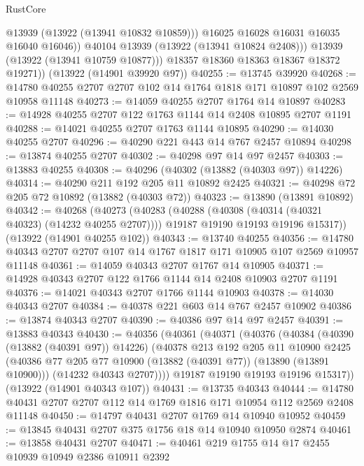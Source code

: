 \begin{lexlean}{RustCore}
\begin{coremodule}
                  @13939
                  (@13922 (@13941 @10832 @10859)))
                @16025
                @16028
                @16031
                @16035
                @16040
                @16046))
            @40104
            @13939
            (@13922 (@13941 @10824 @2408)))
          @13939
          (@13922 (@13941 @10759 @10877)))
        @18357
        @18360
        @18363
        @18367
        @18372
        @19271))
    (@13922 (@14901 @39920 @97))
@40255 := @13745 @39920
@40268 := @14780 @40255 @2707 @2707 @102 @14 @1764 @1818 @171 @10897 @102 @2569 @10958 @11148
@40273 := @14059 @40255 @2707 @1764 @14 @10897
@40283 := @14928 @40255 @2707 @122 @1763 @1144 @14 @2408 @10895 @2707 @1191
@40288 := @14021 @40255 @2707 @1763 @1144 @10895
@40290 := @14030 @40255 @2707
@40296 := @40290 @221 @443 @14 @767 @2457 @10894
@40298 := @13874 @40255 @2707
@40302 := @40298 @97 @14 @97 @2457
@40303 := @13883 @40255
@40308 := @40296 (@40302 (@13882 (@40303 @97)) @14226)
@40314 := @40290 @211 @192 @205 @11 @10892 @2425
@40321 := @40298 @72 @205 @72 @10892 (@13882 (@40303 @72))
@40323 := @13890 (@13891 @10892)
@40342 := @40268
    (@40273
      (@40283
        (@40288 (@40308 (@40314 (@40321 @40323) (@14232 @40255 @2707))))
        @19187
        @19190
        @19193
        @19196
        @15317))
    (@13922 (@14901 @40255 @102))
@40343 := @13740 @40255
@40356 := @14780 @40343 @2707 @2707 @107 @14 @1767 @1817 @171 @10905 @107 @2569 @10957 @11148
@40361 := @14059 @40343 @2707 @1767 @14 @10905
@40371 := @14928 @40343 @2707 @122 @1766 @1144 @14 @2408 @10903 @2707 @1191
@40376 := @14021 @40343 @2707 @1766 @1144 @10903
@40378 := @14030 @40343 @2707
@40384 := @40378 @221 @603 @14 @767 @2457 @10902
@40386 := @13874 @40343 @2707
@40390 := @40386 @97 @14 @97 @2457
@40391 := @13883 @40343
@40430 := @40356
    (@40361
      (@40371
        (@40376
          (@40384
            (@40390 (@13882 (@40391 @97)) @14226)
            (@40378
              @213
              @192
              @205
              @11
              @10900
              @2425
              (@40386 @77 @205 @77 @10900 (@13882 (@40391 @77)) (@13890 (@13891 @10900)))
              (@14232 @40343 @2707))))
        @19187
        @19190
        @19193
        @19196
        @15317))
    (@13922 (@14901 @40343 @107))
@40431 := @13735 @40343
@40444 := @14780 @40431 @2707 @2707 @112 @14 @1769 @1816 @171 @10954 @112 @2569 @2408 @11148
@40450 := @14797 @40431 @2707 @1769 @14 @10940 @10952
@40459 := @13845 @40431 @2707 @375 @1756 @18 @14 @10940 @10950 @2874
@40461 := @13858 @40431 @2707
@40471 := @40461 @219 @1755 @14 @17 @2455 @10939 @10949 @2386 @10911 @2392

\end{coremodule}
\end{lexlean}
